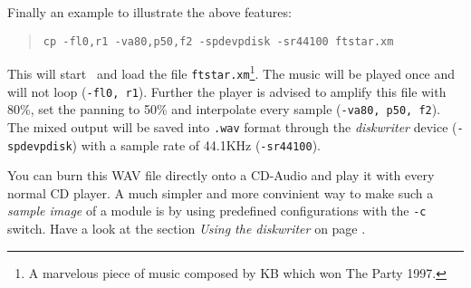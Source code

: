 Finally an example to illustrate the above features:
\begin{quote}
\texttt{cp -fl0,r1 -va80,p50,f2 -spdevpdisk -sr44100 ftstar.xm}
\end{quote}
This will start \cp\ and load the file \texttt{ftstar.xm}\footnote{A marvelous piece of
music composed by KB which won The Party 1997.}. The music will be played once
and will not loop (\texttt{-fl0, r1}). Further the player is advised to amplify
this file with 80\%, set the panning to 50\% and interpolate every sample
(\texttt{-va80, p50, f2}). The mixed output will be saved into \texttt{.wav}
format through the \emph{diskwriter} device (\texttt{-spdevpdisk}) with a
sample rate of 44.1KHz (\texttt{-sr44100}).

You can burn this WAV file directly onto a CD-Audio and play it with every
normal CD player. A much simpler and more convinient way to make such a
\emph{sample image} of a module is by using predefined configurations with
the \texttt{-c} switch. Have a look at the section \emph{Using the diskwriter}
on page \pageref{diskwriter}.
